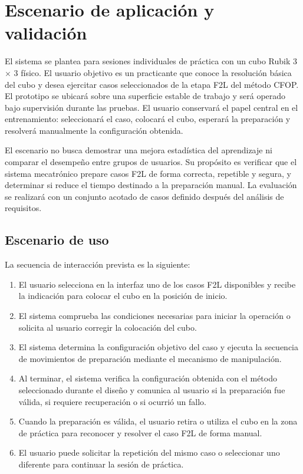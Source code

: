 \section{Escenario de aplicación y validación}

El sistema se plantea para sesiones individuales de práctica con un cubo Rubik 3 $\times$ 3 físico. El usuario objetivo es un practicante que conoce la resolución básica del cubo y desea ejercitar casos seleccionados de la etapa F2L del método CFOP. El prototipo se ubicará sobre una superficie estable de trabajo y será operado bajo supervisión durante las pruebas. El usuario conservará el papel central en el entrenamiento: seleccionará el caso, colocará el cubo, esperará la preparación y resolverá manualmente la configuración obtenida.

El escenario no busca demostrar una mejora estadística del aprendizaje ni comparar el desempeño entre grupos de usuarios. Su propósito es verificar que el sistema mecatrónico prepare casos F2L de forma correcta, repetible y segura, y determinar si reduce el tiempo destinado a la preparación manual. La evaluación se realizará con un conjunto acotado de casos definido después del análisis de requisitos.

\subsection{Escenario de uso}

La secuencia de interacción prevista es la siguiente:

\begin{enumerate}
    \item El usuario selecciona en la interfaz uno de los casos F2L disponibles y recibe la indicación para colocar el cubo en la posición de inicio.
    \item El sistema comprueba las condiciones necesarias para iniciar la operación o solicita al usuario corregir la colocación del cubo.
    \item El sistema determina la configuración objetivo del caso y ejecuta la secuencia de movimientos de preparación mediante el mecanismo de manipulación.
    \item Al terminar, el sistema verifica la configuración obtenida con el método seleccionado durante el diseño y comunica al usuario si la preparación fue válida, si requiere recuperación o si ocurrió un fallo.
    \item Cuando la preparación es válida, el usuario retira o utiliza el cubo en la zona de práctica para reconocer y resolver el caso F2L de forma manual.
    \item El usuario puede solicitar la repetición del mismo caso o seleccionar uno diferente para continuar la sesión de práctica.
\end{enumerate}


